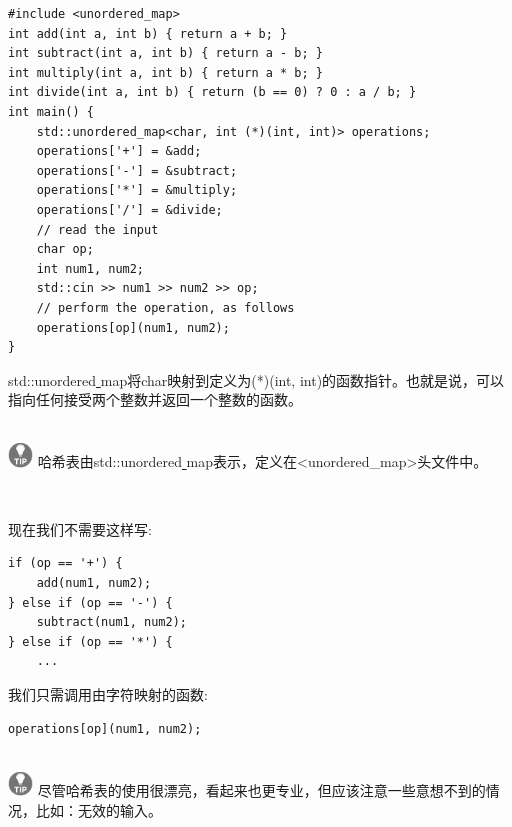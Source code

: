 \begin{lstlisting}[caption={}]
#include <unordered_map>
int add(int a, int b) { return a + b; }
int subtract(int a, int b) { return a - b; }
int multiply(int a, int b) { return a * b; }
int divide(int a, int b) { return (b == 0) ? 0 : a / b; }
int main() {
	std::unordered_map<char, int (*)(int, int)> operations;
	operations['+'] = &add;
	operations['-'] = &subtract;
	operations['*'] = &multiply;
	operations['/'] = &divide;
	// read the input
	char op;
	int num1, num2;
	std::cin >> num1 >> num2 >> op;
	// perform the operation, as follows
	operations[op](num1, num2);
}
\end{lstlisting}

std::unordered\underline{ }map将char映射到定义为(*)(int, int)的函数指针。也就是说，可以指向任何接受两个整数并返回一个整数的函数。 \par

\hspace*{\fill} \\ %
\includegraphics[width=0.05\textwidth]{images/tip}
哈希表由std::unordered\underline{ }map表示，定义在<unordered\_map>头文件中。\par
\noindent\textbf{}\ \par

现在我们不需要这样写: \par

\begin{lstlisting}[caption={}]
if (op == '+') {
	add(num1, num2);
} else if (op == '-') {
	subtract(num1, num2);
} else if (op == '*') {
	...
\end{lstlisting}

我们只需调用由字符映射的函数: \par

\begin{lstlisting}[caption={}]
operations[op](num1, num2);
\end{lstlisting}

\hspace*{\fill} \\ %
\includegraphics[width=0.05\textwidth]{images/tip}
尽管哈希表的使用很漂亮，看起来也更专业，但应该注意一些意想不到的情况，比如：无效的输入。 \par
\noindent\textbf{}\ \par

